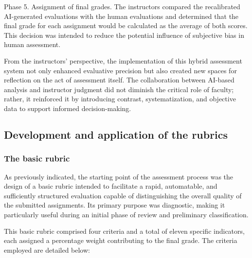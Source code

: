 \documentclass[english]{textolivre}
\begin{document}
Phase 5. Assignment of final grades. The instructors compared the recalibrated AI-generated evaluations with the human evaluations and determined that the final grade for each assignment would be calculated as the average of both scores. This decision was intended to reduce the potential influence of subjective bias in human assessment.

From the instructors’ perspective, the implementation of this hybrid assessment system not only enhanced evaluative precision but also created new spaces for reflection on the act of assessment itself. The collaboration between AI-based analysis and instructor judgment did not diminish the critical role of faculty; rather, it reinforced it by introducing contrast, systematization, and objective data to support informed decision-making.

\subsection{Development and application of the rubrics}\label{sec-2.4}
\subsubsection{The basic rubric}
As previously indicated, the starting point of the assessment process was the design of a basic rubric intended to facilitate a rapid, automatable, and sufficiently structured evaluation capable of distinguishing the overall quality of the submitted assignments. Its primary purpose was diagnostic, making it particularly useful during an initial phase of review and preliminary classification.

This basic rubric comprised four criteria and a total of eleven specific indicators, each assigned a percentage weight contributing to the final grade. The criteria employed are detailed below:
\end{document}
